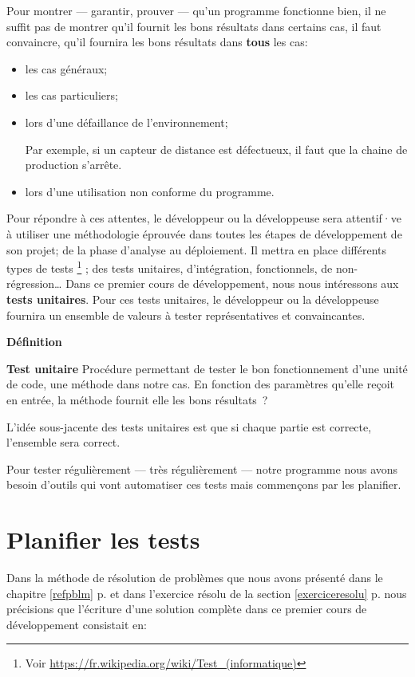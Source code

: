 Pour montrer --- garantir, prouver --- qu'un programme fonctionne bien, il ne
suffit pas de montrer qu'il fournit les bons résultats dans certains cas, il
faut convaincre, qu'il fournira les bons résultats dans \textbf{tous} les cas:

\begin{itemize}
	\item les cas généraux;
	\item les cas particuliers;
	\item lors d'une défaillance de l'environnement;
		
		Par exemple, si un capteur de distance est défectueux, il faut que la 
		chaine de production s'arrête. 
	
	\item lors d'une utilisation non conforme du programme.
\end{itemize}

Pour répondre à ces attentes, le développeur ou la développeuse sera attentif·ve
à utiliser une méthodologie éprouvée dans toutes les étapes de développement de
son projet; de la phase d'analyse au déploiement.  Il mettra en place différents
types de tests
\footnote{Voir \url{https://fr.wikipedia.org/wiki/Test_(informatique)}}
; des tests unitaires, d'intégration, fonctionnels, de non-régression… Dans ce
premier cours de développement, nous nous intéressons aux \textbf{tests
unitaires}.  Pour ces tests unitaires, le développeur ou la développeuse
fournira un ensemble de valeurs à tester représentatives et convaincantes. 

\textbf{Définition}

\textbf{Test unitaire} Procédure permettant de tester le bon fonctionnement
d'une unité de code, une méthode  dans notre cas. En fonction des
paramètres qu'elle reçoit en entrée, la méthode fournit elle les bons résultats~? 

L'idée sous-jacente des tests unitaires est que si chaque partie est correcte,
l'ensemble sera correct. 

Pour tester régulièrement --- très régulièrement --- notre programme nous avons
besoin d'outils qui vont automatiser ces tests mais commençons par les
planifier. 


\section{Planifier les tests}

Dans la méthode de résolution de problèmes que nous avons présenté dans le chapitre \ref{refpblm} p.\pageref{refpblm} et dans l'exercice résolu de la section \ref{exerciceresolu} p.\pageref{exerciceresolu} nous précisions que l'écriture d'une solution complète dans ce premier cours de développement consistait en: 

